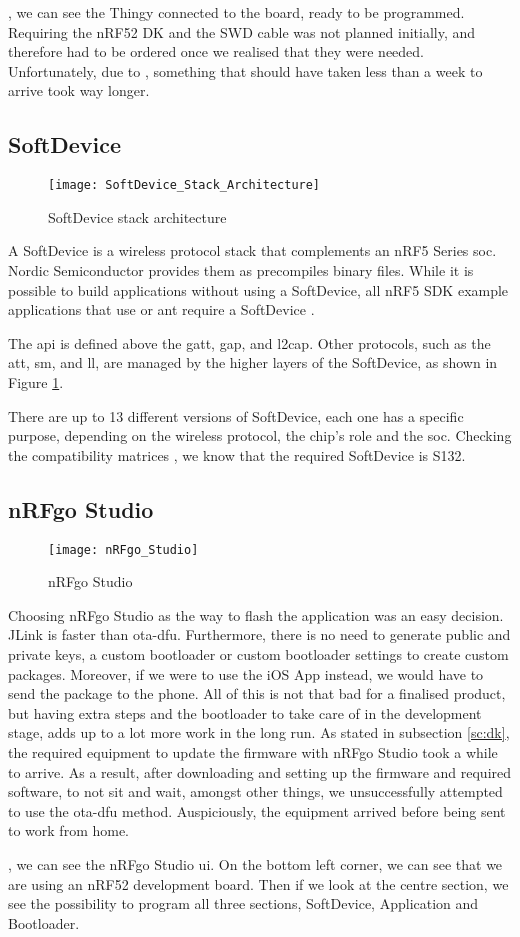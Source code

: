 , we can see the Thingy connected to the board, ready to be programmed. Requiring the nRF52 DK and the SWD cable was not planned initially, and therefore had to be ordered once we realised that they were needed. Unfortunately, due to \cov, something that should have taken less than a week to arrive took way longer.


\subsection{SoftDevice}
\begin{figure}[hbt!]
	\centering
	\texttt{[image: SoftDevice\_Stack\_Architecture]}
	\caption{SoftDevice stack architecture}
	\label{fig:softdevice_stack}
\end{figure}
A SoftDevice is a wireless protocol stack that complements an nRF5 Series \gls{soc}. Nordic Semiconductor provides them as precompiles binary files. While it is possible to build applications without using a SoftDevice, all nRF5 SDK example applications that use \bt or \gls{ant} require a SoftDevice \cite{SoftDevice}.

The \gls{api} is defined above the \gls{gatt}, \gls{gap}, and \gls{l2cap}. Other protocols, such as the \gls{att}, \gls{sm}, and \gls{ll}, are managed by the higher layers of the SoftDevice, as shown in Figure \ref{fig:softdevice_stack}.

There are up to 13 different versions of SoftDevice, each one has a specific purpose, depending on the wireless protocol, the chip's role and the \gls{soc}. Checking the compatibility matrices \cite{SoftDevice}, we know that the required SoftDevice is S132.

\subsection{nRFgo Studio}
\begin{figure}[hbt!]
	\centering
	\texttt{[image: nRFgo\_Studio]}
	\caption{nRFgo Studio}
	\label{fig:nrfgo_studio}
\end{figure}
Choosing nRFgo Studio as the way to flash the application was an easy decision. JLink is faster than \gls{ota-dfu}. Furthermore, there is no need to generate public and private keys, a custom bootloader or custom bootloader settings to create custom packages. Moreover, if we were to use the iOS App instead, we would have to send the package to the phone. All of this is not that bad for a finalised product, but having extra steps and the bootloader to take care of in the development stage, adds up to a lot more work in the long run. As stated in subsection \ref{sc:dk}, the required equipment to update the firmware with nRFgo Studio took a while to arrive. As a result, after downloading and setting up the firmware and required software, to not sit and wait, amongst other things, we unsuccessfully attempted to use the \gls{ota-dfu} method. Auspiciously, the equipment arrived before being sent to work from home.

, we can see the nRFgo Studio \gls{ui}. On the bottom left corner, we can see that we are using an nRF52 development board. Then if we look at the centre section, we see the possibility to program all three sections, SoftDevice, Application and Bootloader.